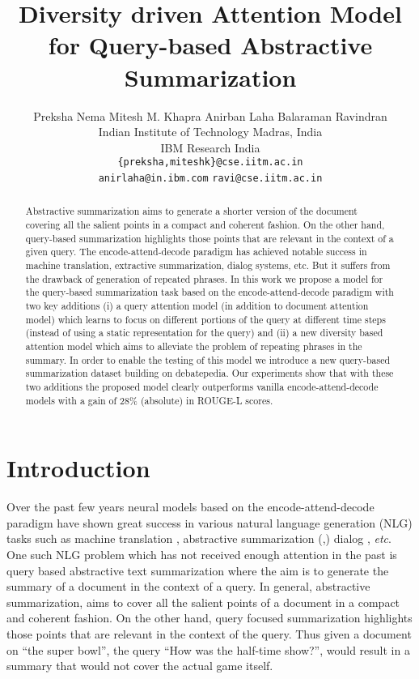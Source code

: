 \documentclass[11pt]{article}
\title{Diversity driven Attention Model for Query-based Abstractive Summarization}
\author{Preksha Nema \hspace{0.1cm} Mitesh M. Khapra \hspace{0.1cm} Anirban Laha \hspace{0.1cm} Balaraman Ravindran\\
  Indian Institute of Technology Madras, India \\ 
   IBM Research India\\
  {\tt \{preksha,miteshk\}@cse.iitm.ac.in} \\ {\tt anirlaha@in.ibm.com} \hspace{0.1cm}  {\tt ravi@cse.iitm.ac.in} \\}
\date{}
\begin{document}
\fontsize{11.5}{14}\rm
\maketitle
\begin{abstract}

Abstractive summarization aims to generate a shorter version of the document covering all the salient points in a compact and coherent fashion. On the other hand, query-based summarization highlights those points that are relevant in the context of a given query. The encode-attend-decode paradigm has achieved notable success in machine translation, extractive summarization, dialog systems, etc. But it suffers from the drawback of generation of repeated phrases. In this work we propose a model for the query-based summarization task based on the encode-attend-decode paradigm with two key additions (i) a query attention model (in addition to document attention model) which learns to focus on different portions of the query at different time steps (instead of using a static representation for the query) and (ii) a new diversity based attention model which aims to alleviate the problem of repeating phrases in the summary. In order to enable the testing of this model we introduce a new query-based summarization dataset building on debatepedia. Our experiments show that with these two additions the proposed model clearly outperforms vanilla encode-attend-decode models with a gain of 28\% (absolute) in ROUGE-L scores.
\end{abstract}





\section{Introduction}
Over the past few years neural models based on the encode-attend-decode \cite{bahdanau2014neural} paradigm have shown great success in various natural language generation (NLG) tasks such as machine translation \cite{bahdanau2014neural}, abstractive summarization (\cite{rush2015neural},\cite{nallapati2016abstractive}) dialog \cite{li2016persona}, \textit{etc}. One such NLG problem which has not received enough attention in the past is query based abstractive text summarization where the aim is to generate the summary of a document in the context of a query. In general, abstractive summarization, aims to cover all the salient points of a document in a compact and coherent fashion. On the other hand, query focused summarization highlights those points that are relevant in the context of the query. Thus given a document on ``the super bowl'',  the query ``How was the half-time show?'', would result in a summary that would not cover the actual game itself.
\end{document}
